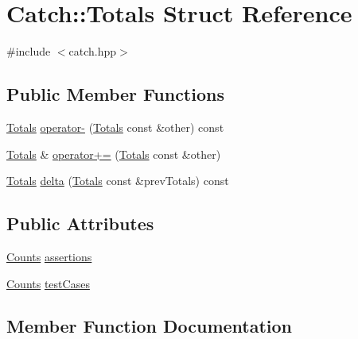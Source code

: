 \hypertarget{structCatch_1_1Totals}{}\section{Catch\+:\+:Totals Struct Reference}
\label{structCatch_1_1Totals}


{\ttfamily \#include $<$catch.\+hpp$>$}

\subsection*{Public Member Functions}
\begin{DoxyCompactItemize}
\item 
\mbox{\hyperlink{structCatch_1_1Totals}{Totals}} \mbox{\hyperlink{structCatch_1_1Totals_a9279ed39139cb7e7b291918a6d08290e}{operator-\/}} (\mbox{\hyperlink{structCatch_1_1Totals}{Totals}} const \&other) const
\item 
\mbox{\hyperlink{structCatch_1_1Totals}{Totals}} \& \mbox{\hyperlink{structCatch_1_1Totals_a574015076e54cc405c70b053e3356e43}{operator+=}} (\mbox{\hyperlink{structCatch_1_1Totals}{Totals}} const \&other)
\item 
\mbox{\hyperlink{structCatch_1_1Totals}{Totals}} \mbox{\hyperlink{structCatch_1_1Totals_a1a94a654f5f3786b75695e081fc9bca2}{delta}} (\mbox{\hyperlink{structCatch_1_1Totals}{Totals}} const \&prev\+Totals) const
\end{DoxyCompactItemize}
\subsection*{Public Attributes}
\begin{DoxyCompactItemize}
\item 
\mbox{\hyperlink{structCatch_1_1Counts}{Counts}} \mbox{\hyperlink{structCatch_1_1Totals_a885ded66df752147b30c3d45aa602ec9}{assertions}}
\item 
\mbox{\hyperlink{structCatch_1_1Counts}{Counts}} \mbox{\hyperlink{structCatch_1_1Totals_adb195fe477aedee2ecea88c888f16506}{test\+Cases}}
\end{DoxyCompactItemize}


\subsection{Member Function Documentation}
\mbox{\label{structCatch_1_1Totals_a1a94a654f5f3786b75695e081fc9bca2}} 
